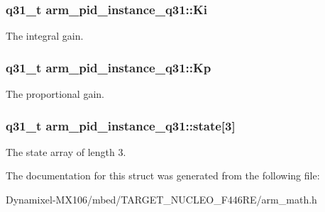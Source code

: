 \subsubsection[{\texorpdfstring{Ki}{Ki}}]{\setlength{\rightskip}{0pt plus 5cm}q31\+\_\+t arm\+\_\+pid\+\_\+instance\+\_\+q31\+::\+Ki}\hypertarget{structarm__pid__instance__q31_aa861d69fd398f29aa0b4b455a823ed72}{}\label{structarm__pid__instance__q31_aa861d69fd398f29aa0b4b455a823ed72}
The integral gain. 
\subsubsection[{\texorpdfstring{Kp}{Kp}}]{\setlength{\rightskip}{0pt plus 5cm}q31\+\_\+t arm\+\_\+pid\+\_\+instance\+\_\+q31\+::\+Kp}\hypertarget{structarm__pid__instance__q31_ac2410bf7f856d58dc1d773d4983cac8e}{}\label{structarm__pid__instance__q31_ac2410bf7f856d58dc1d773d4983cac8e}
The proportional gain. 
\subsubsection[{\texorpdfstring{state}{state}}]{\setlength{\rightskip}{0pt plus 5cm}q31\+\_\+t arm\+\_\+pid\+\_\+instance\+\_\+q31\+::state\mbox{[}3\mbox{]}}\hypertarget{structarm__pid__instance__q31_a228e4a64da6014844a0a671a1fa391d4}{}\label{structarm__pid__instance__q31_a228e4a64da6014844a0a671a1fa391d4}
The state array of length 3. 

The documentation for this struct was generated from the following file\+:\begin{DoxyCompactItemize}
\item 
Dynamixel-\/\+M\+X106/mbed/\+T\+A\+R\+G\+E\+T\+\_\+\+N\+U\+C\+L\+E\+O\+\_\+\+F446\+R\+E/arm\+\_\+math.\+h\end{DoxyCompactItemize}
